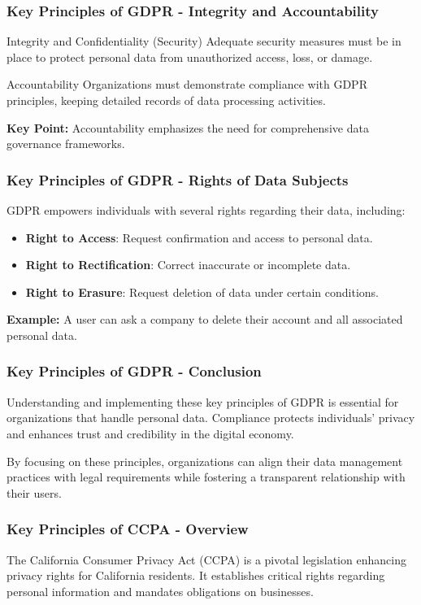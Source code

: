 \documentclass{beamer}
\begin{document}
\begin{frame}[fragile]
    \frametitle{Key Principles of GDPR - Integrity and Accountability}
    \begin{block}{Integrity and Confidentiality (Security)}
        Adequate security measures must be in place to protect personal data from unauthorized access, loss, or damage.
    \end{block}
    \begin{block}{Accountability}
        Organizations must demonstrate compliance with GDPR principles, keeping detailed records of data processing activities.
    \end{block}
    \textbf{Key Point:} Accountability emphasizes the need for comprehensive data governance frameworks.
\end{frame}

\begin{frame}[fragile]
    \frametitle{Key Principles of GDPR - Rights of Data Subjects}
    GDPR empowers individuals with several rights regarding their data, including:
    \begin{itemize}
        \item \textbf{Right to Access}: Request confirmation and access to personal data.
        \item \textbf{Right to Rectification}: Correct inaccurate or incomplete data.
        \item \textbf{Right to Erasure}: Request deletion of data under certain conditions.
    \end{itemize}
    \textbf{Example:} A user can ask a company to delete their account and all associated personal data.
\end{frame}

\begin{frame}[fragile]
    \frametitle{Key Principles of GDPR - Conclusion}
    Understanding and implementing these key principles of GDPR is essential for organizations that handle personal data. Compliance protects individuals' privacy and enhances trust and credibility in the digital economy.
    
    By focusing on these principles, organizations can align their data management practices with legal requirements while fostering a transparent relationship with their users.
\end{frame}

\begin{frame}[fragile]
    \frametitle{Key Principles of CCPA - Overview}
    The California Consumer Privacy Act (CCPA) is a pivotal legislation enhancing privacy rights for California residents. It establishes critical rights regarding personal information and mandates obligations on businesses.
\end{frame}
\end{document}
